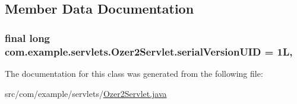 \subsection{Member Data Documentation}
\subsubsection[{\texorpdfstring{serial\+Version\+U\+ID}{serialVersionUID}}]{\setlength{\rightskip}{0pt plus 5cm}final long com.\+example.\+servlets.\+Ozer2\+Servlet.\+serial\+Version\+U\+ID = 1L\hspace{0.3cm}{\ttfamily [static]}, {\ttfamily [private]}}\hypertarget{classcom_1_1example_1_1servlets_1_1_ozer2_servlet_adda557e8b6e5941a32e2aa6a66ad1295}{}\label{classcom_1_1example_1_1servlets_1_1_ozer2_servlet_adda557e8b6e5941a32e2aa6a66ad1295}


The documentation for this class was generated from the following file\+:\begin{DoxyCompactItemize}
\item 
src/com/example/servlets/\hyperlink{_ozer2_servlet_8java}{Ozer2\+Servlet.\+java}\end{DoxyCompactItemize}
